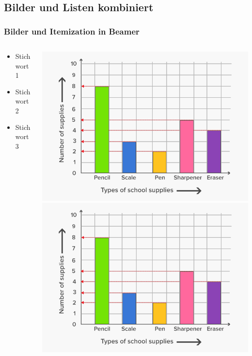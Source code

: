 \documentclass[compress,aspectratio=169]{beamer} %
\begin{document}
	
	\subsection{Bilder und Listen kombiniert} 
	
	\begin{frame}
		\frametitle{Bilder und Itemization in Beamer}
		\begin{columns}
			\begin{column}{5cm}
				\begin{itemize}
					\item Stichwort 1
					\item Stichwort 2
					\item Stichwort 3
				\end{itemize}
				\vspace{3cm} 
			\end{column}
			\begin{column}{3cm}
				\includegraphics[scale=0.15]{PIC1} \\
				\vspace{0.5cm} 
				\includegraphics[scale=0.15]{PIC1}

\end{column}
\end{columns}
\end{frame}
\end{document}
